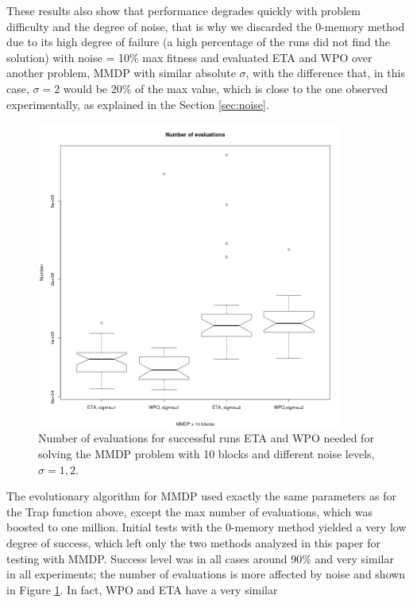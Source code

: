 \documentclass{llncs}
\begin{document}
These results also show that performance degrades quickly with problem
difficulty and the degree of noise, that is why we discarded the
0-memory method due to its high degree of failure (a high percentage of the runs did not find the solution) with noise = 10\%
max fitness and evaluated ETA and WPO over another problem, MMDP with
similar absolute $\sigma$, with the difference that, in this case,
$\sigma=2$ would be 20\% of the max value, which is close to the one
observed experimentally, as explained in the Section \ref{sec:noise}.
\begin{figure}[!t] %
\centering
\includegraphics[width=0.9\textwidth]{../images/evals-mmdp.png}
\caption{Number of evaluations for successful runs ETA and WPO needed for solving the MMDP
  problem with 10 blocks and different noise levels, $\sigma=1,2$. \label{fig:mmdp:evals}}
\end{figure}
%
The evolutionary algorithm for MMDP used exactly the same parameters
as for the Trap function above, except the max number of evaluations, which
was boosted to one million. Initial tests with the 0-memory method
yielded a very low degree of success, which left only the two methods
analyzed in this paper for testing with MMDP. 
Success level was in all cases around 90\% and very similar in all experiments; the number of evaluations is more affected by noise and shown in
Figure \ref{fig:mmdp:evals}. 
In fact, WPO and ETA have a very similar
\end{document}
